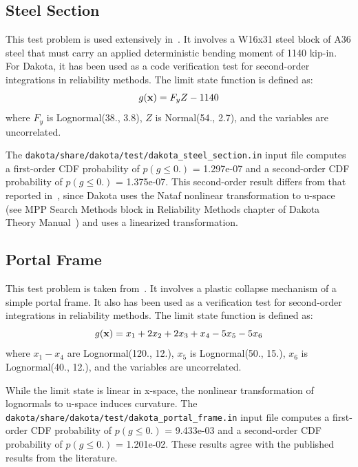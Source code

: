 
\subsection{Steel Section}\label{additional:steel_section}

This test problem is used extensively in~\cite{Hal00}. It involves a
W16x31 steel block of A36 steel that must carry an applied
deterministic bending moment of 1140 kip-in. For Dakota, it has been
used as a code verification test for second-order integrations in
reliability methods. The limit state function is defined as:
\begin{equation}
g({\bf x}) = F_y Z - 1140
\end{equation}
where $F_y$ is Lognormal(38., 3.8), $Z$ is Normal(54., 2.7), and the
variables are uncorrelated.

The \texttt{dakota/share/dakota/test/dakota\_steel\_section.in} input file computes
a first-order CDF probability of $p(g \leq 0.)$ = 1.297e-07 and a
second-order CDF probability of $p(g \leq 0.)$ = 1.375e-07. This
second-order result differs from that reported in~\cite{Hal00}, since
Dakota uses the Nataf nonlinear transformation to u-space (see MPP
Search Methods block in Reliability Methods chapter of Dakota Theory
Manual~\cite{TheoMan}) and \cite{Hal00} uses a linearized
transformation.

\subsection{Portal Frame}\label{additional:portal_frame}


This test problem is taken from~\cite{Tve90,Hon99}. It involves a
plastic collapse mechanism of a simple portal frame. It also has been
used as a verification test for second-order integrations in
reliability methods. The limit state function is defined as:
\begin{equation}
g({\bf x}) = x_1 + 2 x_2 + 2 x_3 + x_4 - 5 x_5 - 5 x_6
\end{equation}
where $x_1 - x_4$ are Lognormal(120., 12.), $x_5$ is Lognormal(50.,
15.), $x_6$ is Lognormal(40., 12.), and the variables are uncorrelated.

While the limit state is linear in x-space, the nonlinear
transformation of lognormals to u-space induces curvature. The
\texttt{dakota/share/dakota/test/dakota\_portal\_frame.in} input file computes a
first-order CDF probability of $p(g \leq 0.)$ = 9.433e-03 and a
second-order CDF probability of $p(g \leq 0.)$ = 1.201e-02. These
results agree with the published results from the literature.

